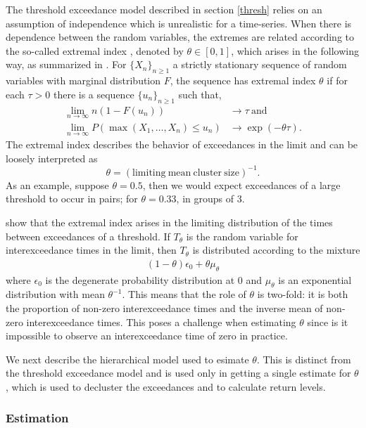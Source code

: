 The threshold exceedance model described in section \ref{thresh} relies on an assumption of independence which is unrealistic for a time-series. When there is dependence between the random variables, the extremes are related according to the so-called extremal index \citep{leadbetter1983extremes}, denoted by $\theta\in[0,1]$, which arises in the following way, as summarized in \cite{ferro2003inference}. For $\{X_n\}_{n\geq 1}$ a strictly stationary sequence of random variables with marginal distribution $F$, the sequence has extremal index $\theta$ if for each $\tau>0$ there is a sequence $\{u_n\}_{n\geq 1}$ such that,
\begin{align}
\lim_{n\rightarrow\infty} n(1-F(u_n)) &\rightarrow \tau \mathrm{~and~} \nonumber \\
\lim_{n\rightarrow\infty} P(\max(X_1,\ldots,X_n)\leq u_n) &\rightarrow \exp(-\theta\tau). \nonumber
\end{align}
The extremal index describes the behavior of exceedances in the limit and can be loosely interpreted as
\[ \theta = (\mathrm{limiting~mean~cluster~size})^{-1}. \]
As an example, suppose $\theta=0.5$, then we would expect exceedances of a large threshold to occur in pairs; for $\theta=0.33$, in groups of 3.

\cite{ferro2003inference} show that the extremal index arises in the limiting distribution of the times between exceedances of a threshold. If $T_\theta$ is the random variable for interexceedance times in the limit, then $T_\theta$ is distributed according to the mixture
\begin{align}
(1-\theta)\epsilon_0 + \theta \mu_\theta
\end{align}
where $\epsilon_0$ is the degenerate probability distribution at $0$ and $\mu_\theta$ is an exponential distribution with mean $\theta^{-1}$. This means that the role of $\theta$ is two-fold: it is both the proportion of non-zero interexceedance times and the inverse mean of non-zero interexceedance times. This poses a challenge when estimating $\theta$ since is it impossible to observe an interexceedance time of zero in practice.

We next describe the hierarchical model used to esimate $\theta$. This is distinct from the threshold exceedance model and is used only in getting a single estimate for $\theta$, which is used to decluster the exceedances and to calculate return levels.

\subsubsection{Estimation}

